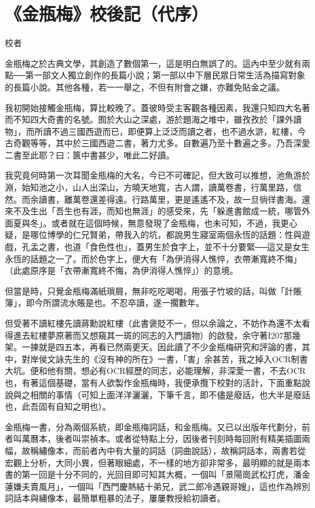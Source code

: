 \chapter*{《金瓶梅》校後記（代序）}

\begin{declareqianyan}
校者\qquad\ 
\end{declareqianyan}	

金瓶梅之於古典文學，其創造了數個第一，這是明白無誤了的。這內中至少就有兩點──第一部文人獨立創作的長篇小說；第一部以中下層民眾日常生活為描寫對象的長篇小說。其他各種，若一一舉之，不但有附會之嫌，亦難免貼金之議。

我初開始接觸金瓶梅，算比較晚了。蓋彼時受主客觀各種因素，我還只知四大名著而不知四大奇書的名號。囿於大山之深處，游於題海之堆中，雖孜孜於「課外讀物」，而所讀不過三國西遊而已，即便算上泛泛而讀之者，也不過水滸，紅樓，今古奇觀等等，其中於三國西遊二書，著力尤多。自數遍乃至十數遍之多。乃吾深愛二書至此耶？曰：篋中書甚少，唯此二好讀。

我究竟何時第一次耳聞金瓶梅的大名，今已不可確記，但大致可以推想，池魚游於淵，始知池之小，山人出深山，方曉天地寬，古人謂，讀萬卷書，行萬里路，信然。而余讀書，離萬卷還差得遠。行路萬里，更是遙遙不及，故一旦徜徉書海。還來不及生出「吾生也有涯，而知也無涯」的感受來，先「躲進書館成一統，哪管外面夏與冬」。或者就在這個時候，無意發現了金瓶梅，也未可知，不過，我更心疑，是哪位博學的仁兄賢弟，帶我入的坑，都說男生寢室兩個永恆的話題：性與遊戲，孔孟之書，也道「食色性也」，蓋男生於食字上，並不十分要緊──這又是女生永恆的話題之一了。而於色字上，便大有「為伊消得人憔悴，衣帶漸寬終不悔」（此處原序是「衣帶漸寬終不悔，為伊消得人憔悴」）的意境。

但當是時，只覺金瓶梅滿紙瑣屑，無非吃吃喝喝，用張子竹坡的話，叫做「計賬簿」，即今所謂流水賬是也。不忍卒讀，遂一擱數年。

但受著不讀紅樓先讀蔣勳說紅樓（此書褒貶不一，但以余論之，不妨作為還不太看得進去紅樓夢原著而又想窺其一斑的同志的入門讀物）的啟發，余守著I207那幾架。一揀就是四五本，再看已然兩更天。因此讀了不少金瓶梅研究和評論的書，其中，對岸侯文詠先生的《沒有神的所在》一書，「害」余甚苦，我之掉入OCR制書大坑。便和他有關，想必有OCR經歷的同志，必能理解，非深愛一書，不去OCR也，有著這個基礎，當有人欲製作金瓶梅時，我便承攬下校對的活計，下面重點說說與之相關的事情（可知上面洋洋灑灑，下筆千言，即不儘是廢話，也大半是廢話也，此吾固有自知之明也）。

金瓶梅一書，分為兩個系統，即金瓶梅詞話，和金瓶梅。又已以出版年代劃分，前者叫萬曆本，後者叫崇禎本。或者從特點上分，因後者刊刻時每回附有精美插圖兩幅，故稱繡像本，而前者內中有大量的詞話（詞曲說話），故稱詞話本，兩書若從宏觀上分析，大同小異，但著眼細處，不一樣的地方卻非常多，最明顯的就是兩本書的第一回是十分不同的，光回目即可知其大概，一個叫「景陽崗武松打虎，潘金蓮嫌夫賣風月」，一個叫「西門慶熱結十弟兄，武二郎冷遇親哥嫂」，這也作為辨別詞話本與繡像本，最簡單粗暴的法子，屢屢教授給初讀者。

